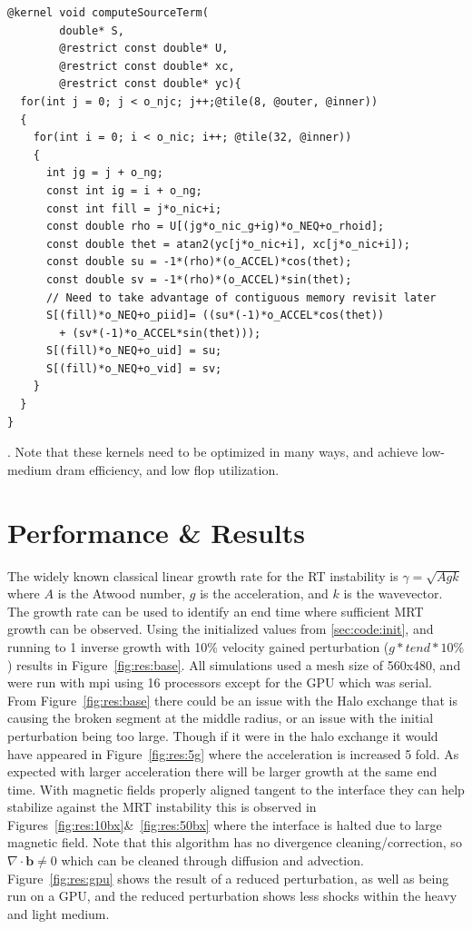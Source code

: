 \documentclass[paper=a4, fontsize=11pt]{scrartcl}
\numberwithin{equation}{section}                %
\numberwithin{figure}{section}                  %
\numberwithin{table}{section}                           %
\begin{document}
\begin{verbatim}
@kernel void computeSourceTerm(
        double* S, 
        @restrict const double* U, 
        @restrict const double* xc, 
        @restrict const double* yc){
  for(int j = 0; j < o_njc; j++;@tile(8, @outer, @inner))
  {
    for(int i = 0; i < o_nic; i++; @tile(32, @inner))
    {
      int jg = j + o_ng;
      const int ig = i + o_ng;
      const int fill = j*o_nic+i;
      const double rho = U[(jg*o_nic_g+ig)*o_NEQ+o_rhoid];
      const double thet = atan2(yc[j*o_nic+i], xc[j*o_nic+i]);
      const double su = -1*(rho)*(o_ACCEL)*cos(thet);
      const double sv = -1*(rho)*(o_ACCEL)*sin(thet);
      // Need to take advantage of contiguous memory revisit later
      S[(fill)*o_NEQ+o_piid]= ((su*(-1)*o_ACCEL*cos(thet)) 
        + (sv*(-1)*o_ACCEL*sin(thet)));
      S[(fill)*o_NEQ+o_uid] = su;
      S[(fill)*o_NEQ+o_vid] = sv;
    }        
  }           
}
\end{verbatim}
. Note that these kernels need to be optimized in many ways, and achieve low-medium dram efficiency, and low flop utilization.

\section{Performance \& Results}
The widely known classical linear growth rate for the RT instability is $\gamma = \sqrt{A g k}$ where $A$ is the Atwood number, $g$ is the acceleration, and $k$ is the wavevector. The growth rate can be used to identify an end time where sufficient MRT growth can be observed. Using the initialized values from \ref{sec:code:init}, and running to 1 inverse growth with 10\% velocity gained perturbation ($g*tend*10\%$) results in Figure~\ref{fig:res:base}. All simulations used a mesh size of 560x480, and were run with mpi using 16 processors except for the GPU which was serial. From Figure~\ref{fig:res:base} there could be an issue with the Halo exchange that is causing the broken segment at the middle radius, or an issue with the initial perturbation being too large. Though if it were in the halo exchange it would have appeared in Figure~\ref{fig:res:5g} where the acceleration is increased 5 fold. As expected with larger acceleration there will be larger growth at the same end time. With magnetic fields properly aligned tangent to the interface they can help stabilize against the MRT instability this is observed in Figures~\ref{fig:res:10bx}\&~\ref{fig:res:50bx} where the interface is halted due to large magnetic field. Note that this algorithm has no divergence cleaning/correction, so $\nabla\cdot\mathbf{b}\neq0$ which can be cleaned through diffusion and advection. Figure~\ref{fig:res:gpu} shows the result of a reduced perturbation, as well as being run on a GPU, and the reduced perturbation shows less shocks within the heavy and light medium.
\end{document}
